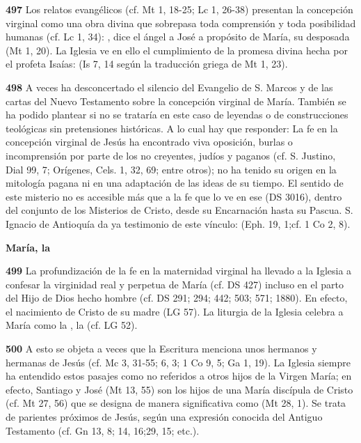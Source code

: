 \begin{body}
\begin{body}
\textbf{497} Los relatos evangélicos (cf. Mt 1, 18-25; Lc 1, 26-38) presentan la concepción virginal como una obra divina que sobrepasa toda comprensión y toda posibilidad humanas (cf. Lc 1, 34): , dice el ángel a José a propósito de María, su desposada (Mt 1, 20). La Iglesia ve en ello el cumplimiento de la promesa divina hecha por el profeta Isaías:  (Is 7, 14 según la traducción griega de Mt 1, 23).

\textbf{498} A veces ha desconcertado el silencio del Evangelio de S. Marcos y de las cartas del Nuevo Testamento sobre la concepción virginal de María. También se ha podido plantear si no se trataría en este caso de leyendas o de construcciones teológicas sin pretensiones históricas. A lo cual hay que responder: La fe en la concepción virginal de Jesús ha encontrado viva oposición, burlas o incomprensión por parte de los no creyentes, judíos y paganos (cf. S. Justino, Dial 99, 7; Orígenes, Cels. 1, 32, 69; entre otros); no ha tenido su origen en la mitología pagana ni en una adaptación de las ideas de su tiempo. El sentido de este misterio no es accesible más que a la fe que lo ve en ese  (DS 3016), dentro del conjunto de los Misterios de Cristo, desde su Encarnación hasta su Pascua. S. Ignacio de Antioquía da ya testimonio de este vínculo:  (Eph. 19, 1;cf. 1 Co 2, 8).\textbf{\\ }

\textbf{María, la }

\textbf{499} La profundización de la fe en la maternidad virginal ha llevado a la Iglesia a confesar la virginidad real y perpetua de María (cf. DS 427) incluso en el parto del Hijo de Dios hecho hombre (cf. DS 291; 294; 442; 503; 571; 1880). En efecto, el nacimiento de Cristo  de su madre (LG 57). La liturgia de la Iglesia celebra a María como la , la  (cf. LG 52).

\textbf{500} A esto se objeta a veces que la Escritura menciona unos hermanos y hermanas de Jesús (cf. Mc 3, 31-55; 6, 3; 1 Co 9, 5; Ga 1, 19). La Iglesia siempre ha entendido estos pasajes como no referidos a otros hijos de la Virgen María; en efecto, Santiago y José  (Mt 13, 55) son los hijos de una María discípula de Cristo (cf. Mt 27, 56) que se designa de manera significativa como  (Mt 28, 1). Se trata de parientes próximos de Jesús, según una expresión conocida del Antiguo Testamento (cf. Gn 13, 8; 14, 16;29, 15; etc.).


\end{body}
\end{body}
